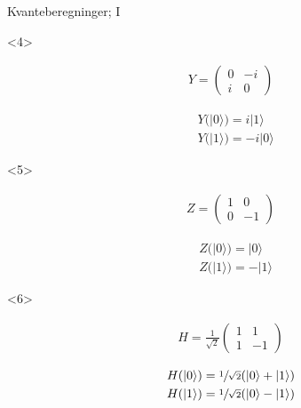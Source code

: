 \documentclass[norsk]{beamer}
\begin{document}
\begin{frame}{Kvanteberegninger; I}
\begin{itemize}
			\begin{onlyenv}<4>
				\begin{minipage}{0.25\textwidth}
					\begin{align*}
						Y = \begin{pmatrix*}
							0 & -i \\
							i & 0
						\end{pmatrix*}
					\end{align*}
				\end{minipage}
				\begin{minipage}{0.25\textwidth}
					\begin{align*}
						& Y(|0\rangle) = i|1\rangle \\
						& Y(|1\rangle) = -i|0\rangle
					\end{align*}
				\end{minipage}
			\end{onlyenv}

			\begin{onlyenv}<5>
				\begin{minipage}{0.25\textwidth}
					\begin{align*}
						Z = \begin{pmatrix*}
							1 & 0 \\
							0 & -1
						\end{pmatrix*}
					\end{align*}
				\end{minipage}
				\begin{minipage}{0.25\textwidth}
					\begin{align*}
						& Z(|0\rangle) = |0\rangle \\
						& Z(|1\rangle) = -|1\rangle
					\end{align*}
				\end{minipage}
			\end{onlyenv}

			\begin{onlyenv}<6>
				\begin{minipage}{0.3\textwidth}
					\begin{align*}
						H = \frac{1}{\sqrt{2}}\begin{pmatrix*}
							1 & 1 \\
							1 & -1
						\end{pmatrix*}
					\end{align*}					
				\end{minipage}
				\begin{minipage}{0.3\textwidth}
					\begin{align*}
						& H(|0\rangle) = \sfrac{1}{\sqrt{2}}(|0\rangle + |1\rangle) \\
						& H(|1\rangle) = \sfrac{1}{\sqrt{2}}(|0\rangle - |1\rangle)
					\end{align*}
				\end{minipage}
			\end{onlyenv}


\end{itemize}
\end{frame}
\end{document}
